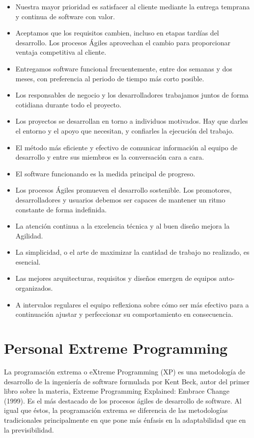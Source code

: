 \begin{itemize}
	\itemsep1pt \parskip1pt 
	\item Nuestra mayor prioridad es satisfacer al cliente mediante la entrega temprana y continua de software con valor.
	\item Aceptamos que los requisitos cambien, incluso en etapas tardías del desarrollo. Los procesos Ágiles aprovechan el cambio para proporcionar ventaja competitiva al	cliente.
	\item Entregamos software funcional frecuentemente, entre dos semanas y dos meses, con preferencia al periodo de tiempo más corto posible.
	\item Los responsables de negocio y los desarrolladores	trabajamos juntos de forma cotidiana durante todo el proyecto.
	\item Los proyectos se desarrollan en torno a individuos motivados. Hay que darles el entorno y el apoyo que necesitan, y confiarles la ejecución del trabajo.
	\item El método más eficiente y efectivo de comunicar información al equipo de desarrollo y entre sus miembros es la conversación cara a cara.
	\item El software funcionando es la medida principal de	progreso.
	\item Los procesos Ágiles promueven el desarrollo sostenible. Los promotores, desarrolladores y usuarios
	debemos ser capaces de mantener un ritmo constante de forma indefinida.
	\item La atención continua a la excelencia técnica y al	buen diseño mejora la Agilidad.
	\item La simplicidad, o el arte de maximizar la cantidad de	trabajo no realizado, es esencial.
	\item Las mejores arquitecturas, requisitos y diseños emergen de equipos auto-organizados.
	\item A intervalos regulares el equipo reflexiona sobre	cómo ser más efectivo para a continuación ajustar y perfeccionar su comportamiento en consecuencia.
\end{itemize}

\section{Personal Extreme Programming}
La programación extrema o eXtreme Programming (XP) es una metodología de desarrollo de la ingeniería de software formulada por Kent Beck, autor del primer libro sobre la materia, Extreme Programming Explained: Embrace Change (1999). Es el más destacado de los procesos ágiles de desarrollo de software. Al igual que éstos, la programación extrema se diferencia de las metodologías tradicionales principalmente en que pone más énfasis en la adaptabilidad que en la previsibilidad.

